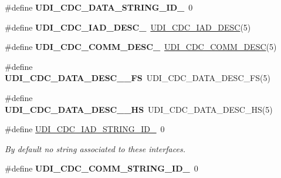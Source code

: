 \begin{DoxyCompactItemize}
\item 
\hypertarget{group__udi__cdc__group__desc_gaa26ae6d61dbe2fad6c5167eed95c475d}{\#define {\bfseries U\-D\-I\-\_\-\-C\-D\-C\-\_\-\-D\-A\-T\-A\-\_\-\-S\-T\-R\-I\-N\-G\-\_\-\-I\-D\-\_}~0}\label{group__udi__cdc__group__desc_gaa26ae6d61dbe2fad6c5167eed95c475d}

\item 
\hypertarget{group__udi__cdc__group__desc_gaa8571a128581bbd617d149c4ad4a1743}{\#define {\bfseries U\-D\-I\-\_\-\-C\-D\-C\-\_\-\-I\-A\-D\-\_\-\-D\-E\-S\-C\-\_}~\hyperlink{group__udi__cdc__group__desc_ga39928ecb0423aff5f7ab70ae98eb2c94}{U\-D\-I\-\_\-\-C\-D\-C\-\_\-\-I\-A\-D\-\_\-\-D\-E\-S\-C}(5)}\label{group__udi__cdc__group__desc_gaa8571a128581bbd617d149c4ad4a1743}

\item 
\hypertarget{group__udi__cdc__group__desc_ga035e1a92f1deced2701fbd0cf8231bcf}{\#define {\bfseries U\-D\-I\-\_\-\-C\-D\-C\-\_\-\-C\-O\-M\-M\-\_\-\-D\-E\-S\-C\-\_}~\hyperlink{group__udi__cdc__group__desc_gac76fc1207bccd36e9851945206c063c0}{U\-D\-I\-\_\-\-C\-D\-C\-\_\-\-C\-O\-M\-M\-\_\-\-D\-E\-S\-C}(5)}\label{group__udi__cdc__group__desc_ga035e1a92f1deced2701fbd0cf8231bcf}

\item 
\hypertarget{group__udi__cdc__group__desc_gad4cbb1beda497a3fe60e2ffb7665697e}{\#define {\bfseries U\-D\-I\-\_\-\-C\-D\-C\-\_\-\-D\-A\-T\-A\-\_\-\-D\-E\-S\-C\-\_\-\_\-\-F\-S}~U\-D\-I\-\_\-\-C\-D\-C\-\_\-\-D\-A\-T\-A\-\_\-\-D\-E\-S\-C\-\_\-\-F\-S(5)}\label{group__udi__cdc__group__desc_gad4cbb1beda497a3fe60e2ffb7665697e}

\item 
\hypertarget{group__udi__cdc__group__desc_ga6a7c54dd3431ce96ff4421639ca7d2a7}{\#define {\bfseries U\-D\-I\-\_\-\-C\-D\-C\-\_\-\-D\-A\-T\-A\-\_\-\-D\-E\-S\-C\-\_\-\_\-\-H\-S}~U\-D\-I\-\_\-\-C\-D\-C\-\_\-\-D\-A\-T\-A\-\_\-\-D\-E\-S\-C\-\_\-\-H\-S(5)}\label{group__udi__cdc__group__desc_ga6a7c54dd3431ce96ff4421639ca7d2a7}

\item 
\hypertarget{group__udi__cdc__group__desc_gad2774c5432e998bc09ffde62461cfeae}{\#define \hyperlink{group__udi__cdc__group__desc_gad2774c5432e998bc09ffde62461cfeae}{U\-D\-I\-\_\-\-C\-D\-C\-\_\-\-I\-A\-D\-\_\-\-S\-T\-R\-I\-N\-G\-\_\-\-I\-D\-\_}~0}\label{group__udi__cdc__group__desc_gad2774c5432e998bc09ffde62461cfeae}

\begin{DoxyCompactList}\small\item\em By default no string associated to these interfaces. \end{DoxyCompactList}\item 
\hypertarget{group__udi__cdc__group__desc_ga907877515ced98c1b483a23b2a7973c2}{\#define {\bfseries U\-D\-I\-\_\-\-C\-D\-C\-\_\-\-C\-O\-M\-M\-\_\-\-S\-T\-R\-I\-N\-G\-\_\-\-I\-D\-\_}~0}\label{group__udi__cdc__group__desc_ga907877515ced98c1b483a23b2a7973c2}


\end{DoxyCompactItemize}
